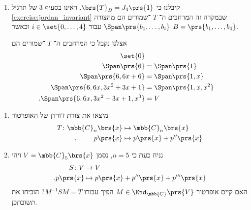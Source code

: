 \documentclass[a4paper,10pt,twoside,openany]{book}
\begin{document}
\begin{solution}
\begin{enumerate}
\item
קיבלנו כי
$\brs{T}_B = J_4\prs{1}$.
ראינו בסעיף 3 של תרגיל
\ref{exercise:jordan_invariant}
שבמקרה זה המרחבים ה־%
$T$%
־שמורים הם מהצורה
$\Span\prs{b_1, \ldots, b_i}$
עבור
$i \in \set{0, \ldots, 4}$
וכאשר
$B = \prs{b_1, \ldots, b_4}$.

אצלנו נקבל כי המרחבים ה־%
$T$%
־שמורים הם
\begin{align*}
\set{0} \\
\Span\prs{6} &= \Span\prs{1} \\
\Span\prs{6, 6x + 6} &= \Span\prs{1, x} \\
\Span\prs{6, 6x, 3 x^2 + 3x + 1} &= \Span\prs{1,x, x^2} \\
\text{.} \Span\prs{6,6x, 3x^2 + 3x + 1, x^3} &= V
\end{align*}
\end{enumerate}
\end{solution}

\begin{exercisechap}
\begin{enumerate}
\item מיצאו את צורת ז'ורדן של האופרטור
\begin{align*}
T \colon \mbb{C}_n\brs{x} &\mapsto \mbb{C}_n\brs{x} \\
\text{.} \hphantom{lalala} p\prs{x} &\mapsto p\prs{x} + p''\prs{x}
\end{align*}

\item
נניח כעת כי
$n = 5$,
נסמן
$V = \mbb{C}_5\brs{x}$
ויהי
\begin{align*}
S \colon V &\to V \\
\text{.} p\prs{x} &\mapsto p\prs{x} + p''\prs{x} + p'''\prs{x}
\end{align*}
האם קיים אופרטור
$M \in \End_{\mbb{C}}\prs{V}$
הפיך עבורו
$M^{-1} S M = T$?
הוכיחו את תשובתכן.
\end{enumerate}
\end{exercisechap}
\end{document}
